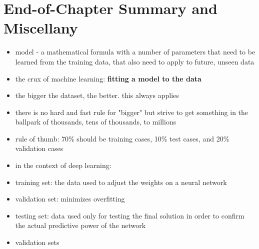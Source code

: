 \documentclass[11pt, twocolumn]{report}
\begin{document}
\section{End-of-Chapter Summary and Miscellany}
\begin{itemize}
  \item model - a mathematical formula with a number of parameters that need to
    be learned from the training data, that also need to apply to future,
    unseen data
  \item the crux of machine learning: \textbf{fitting a model to the data}
  \item the bigger the dataset, the better. this always applies
  \item there is no hard and fast rule for "bigger" but strive to get something
    in the ballpark of thousands, tens of thousands, to millions
  \item rule of thumb: 70\% should be training cases, 10\% test cases, and 20\%
    validation cases
  \item in the context of deep learning:
  \item training set: the data used to adjust the weights on a neural network
  \item validation set: minimizes overfitting
  \item testing set: data used only for testing the final solution in order to
    confirm the actual predictive power of the network
  \item validation sets
\end{itemize}
\end{document}
